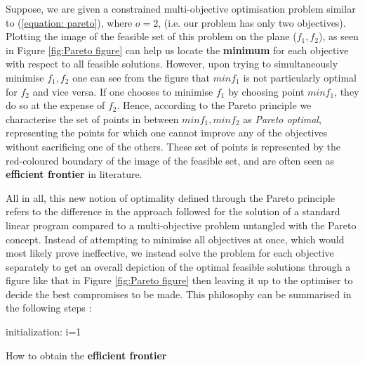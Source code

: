 \vspace{\baselineskip}
\noindent
Suppose, we are given a constrained multi-objective optimisation problem similar to (\ref{equation: pareto}), where $o=2$, (i.e. our problem has only two objectives). Plotting the image of the feasible set of this problem on the plane ($f_1,f_2$), as seen in Figure \ref{fig:Pareto figure} \cite{Taheri2014ParetoFF} can help us locate the \textbf{minimum} for each objective with respect to all feasible solutions. However, upon trying to simultaneously minimise $f_1,f_2$ one can see from the figure that $minf_1$ is not particularly optimal for $f_2$ and vice versa. If one chooses to minimise $f_1$ by choosing point $minf_1$, they do so at the expense of $f_2$. Hence, according to the Pareto principle we characterise the set of points in between $minf_1,minf_2$ as \textit{Pareto optimal}, representing the points for which one cannot improve any of the objectives without sacrificing one of the others. These set of points is represented by the red-coloured boundary of the image of the feasible set, and are often seen as \textbf{efficient frontier} in literature.

\vspace{\baselineskip}
\noindent
All in all, this new notion of optimality defined through the Pareto principle refers to the difference in the approach followed for the solution of a standard linear program compared to a multi-objective problem untangled with the Pareto concept. Instead of attempting to minimise all objectives at once, which would most likely prove ineffective, we instead solve the problem for each objective separately to get an overall depiction of the optimal feasible solutions through a figure like that in Figure \ref{fig:Pareto figure} then leaving it up to the optimiser to decide the best compromises to be made. This philosophy can be summarised in the following steps \cite{DUMMY:6}:

\begin{algorithm}[H]
\SetAlgoLined
{}
 initialization: i=1\;
 \caption{How to obtain the \textbf{efficient frontier}}
 \label{alg: Pareto}
\end{algorithm}

